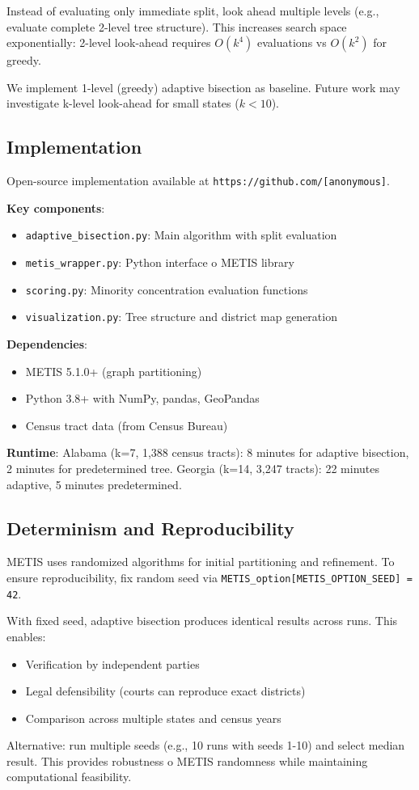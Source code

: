 Instead of evaluating only immediate split, look ahead multiple levels (e.g., evaluate complete 2-level tree structure). This increases search space exponentially: 2-level look-ahead requires $O(k^4)$ evaluations vs $O(k^2)$ for greedy.

We implement 1-level (greedy) adaptive bisection as baseline. Future work may investigate k-level look-ahead for small states ($k < 10$).

\subsection{Implementation}

Open-source implementation available at \texttt{https://github.com/[anonymous]}.

\textbf{Key components}:
\begin{itemize}
\item \texttt{adaptive\_bisection.py}: Main algorithm with split evaluation
\item \texttt{metis\_wrapper.py}: Python interface 	o METIS library
\item \texttt{scoring.py}: Minority concentration evaluation functions
\item \texttt{visualization.py}: Tree structure and district map generation
\end{itemize}

\textbf{Dependencies}:
\begin{itemize}
\item METIS 5.1.0+ (graph partitioning)
\item Python 3.8+ with NumPy, pandas, GeoPandas
\item Census tract data (from Census Bureau)
\end{itemize}

\textbf{Runtime}: Alabama (k=7, 1,388 census tracts): 8 minutes for adaptive bisection, 2 minutes for predetermined tree. Georgia (k=14, 3,247 tracts): 22 minutes adaptive, 5 minutes predetermined.

\subsection{Determinism and Reproducibility}

METIS uses randomized algorithms for initial partitioning and refinement. To ensure reproducibility, fix random seed via \texttt{METIS\_option[METIS\_OPTION\_SEED] = 42}.

With fixed seed, adaptive bisection produces identical results across runs. This enables:
\begin{itemize}
\item Verification by independent parties
\item Legal defensibility (courts can reproduce exact districts)
\item Comparison across multiple states and census years
\end{itemize}

Alternative: run multiple seeds (e.g., 10 runs with seeds 1-10) and select median result. This provides robustness 	o METIS randomness while maintaining computational feasibility.
